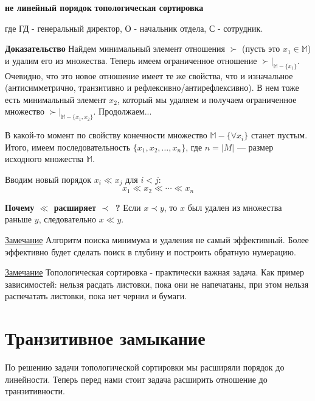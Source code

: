\documentclass{article}
\begin{document}
        \textbf{ не линейный порядок} \qquad \qquad \textbf{топологическая сортировка}
        
		где ГД - генеральный директор, О - начальник отдела, С - сотрудник.
	
	\textbf{Доказательство}
		Найдем минимальный элемент отношения $\succ$ (пусть это $x_1 \in \mathbb{M}$) и удалим его из множества. Теперь имеем ограниченное отношение $\succ |_{\mathbb{M}-\{x_1\}}$. Очевидно, что это новое отношение имеет те же свойства, что и изначальное (антисимметрично, транзитивно и рефлексивно/антирефлексивно). В нем тоже есть минимальный элемент $x_2$, который мы удаляем и получаем ограниченное множество $\succ |_{\mathbb{M}-\{x_1, x_2\}}$. Продолжаем...
		
		В какой-то момент по свойству конечности множество $\mathbb{M}-\{\forall x_i\}$ станет пустым. Итого, имеем последовательность $\{x_1, x_2, \dots, x_n\}$, где $n = |M|$ --- размер исходного множества $\mathbb{M}$.
		
		Вводим новый порядок $x_i \ll x_j$ для $i < j$:
		$$x_1 \ll x_2 \ll \cdots \ll x_n$$
		
		\textbf{Почему $\ll$ расширяет $\prec$~?} 
		Если $x \prec y$, то $x$ был удален из множества раньше $y$, следовательно $x \ll y$.
	
	\underline{Замечание}
		Алгоритм поиска минимума и удаления не самый эффективный. Более эффективно будет сделать поиск в глубину и построить обратную нумерацию.
	
	
	\underline{Замечание}
		Топологическая сортировка - практически важная задача. Как пример зависимостей: нельзя расдать листовки, пока они не напечатаны, при этом нельзя распечатать листовки, пока нет чернил и бумаги.
	
		\section{Транзитивное замыкание}
	По решению задачи топологической сортировки мы расширяли порядок до линейности. Теперь перед нами стоит задача расширить отношение до транзитивности.
	
\end{document}
